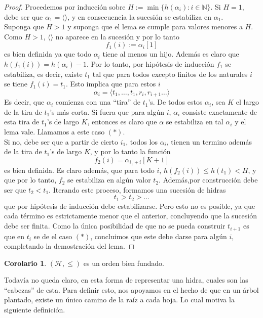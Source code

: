 \documentclass[a4paper,11pt]{article}
\newcommand{\matN}{\mathbb{N}}
\newcommand{\mH}{\mathcal{H}}
\newcommand{\lag}{\langle}
\newcommand{\rag}{\rangle}
\theoremstyle{definition}
\newtheorem{corolary}{Corolario}
\begin{document}
\begin{proof}
  Procedemos por inducción sobre $H := \min\{h(\alpha_i) : i \in \matN\}$. Si
  $H = 1$, debe ser que $\alpha_1= \lag\rag$, y en consecuencia la sucesión se estabiliza
  en $\alpha_1$.\\
  Suponga que $H>1$ y suponga que el lema se cumple para valores menores a $H$.
  Como $H>1$, $\lag\rag$ no aparece en la sucesión y por lo tanto
  $$
  f_{1}(i) := \alpha_i[1]
  $$
  es bien definida ya que todo $\alpha_i$ tiene al menos un hijo. Además
  es claro que $h(f_1(i)) = h(\alpha_i) - 1$. Por lo tanto, por hipótesis de inducción
  $f_1$ se estabiliza, es decir, existe $t_1$ tal que para todos excepto finitos
  de los naturales $i$ se tiene $f_1(i) = t_1$. Esto implica que para estos $i$
  $$
  \alpha_i = \lag t_1,\dots,t_1,r_i,r_{i+1}\dots\rag
  $$
  Es decir, que $\alpha_i$ comienza con una ``tira'' de $t_1$'s. De todos estos
  $\alpha_i$, sea $K$ el largo de la tira de $t_1$'s más corta. Si fuera
  que para algún $i$, $\alpha_i$ consiste exactamente de esta tira de $t_1$'s de
  largo $K$, entonces es claro que $\alpha$ se estabiliza en tal $\alpha_i$ y el
  lema vale. Llamamos a este caso $(\ast)$.\\
  Si no, debe ser que a partir de cierto $i_1$, todos los $\alpha_i$, tienen
  un termino además de la tira de $t_1$'s de largo $K$, y por lo tanto la función
  $$
  f_2(i) = \alpha_{i_1 + i}[K+1]
  $$
  es bien definida. Es claro además, que para todo $i$, $h(f_2(i)) \leq h(t_1) < H$,
  y que por lo tanto, $f_2$ se estabiliza en algún valor $t_2$. Además,por construcción
  debe ser que $t_2 < t_1$.
  Iterando este proceso, formamos una sucesión de hidras
  $$
  t_1 > t_2 > \dots
  $$
  que por hipótesis de inducción debe estabilizarse. Pero esto no es posible, ya que
  cada término es estrictamente menor que el anterior, concluyendo que la sucesión
  debe ser finita. Como la única posibilidad de que no se pueda construir $t_{i+1}$
  es que en $t_i$ se de el caso $(\ast)$, concluimos que este debe darse para algún $i$,
  completando la demostración del lema.
\end{proof}

\begin{corolary}
  $(\mH,\leq)$ es un orden bien fundado.
\end{corolary}

Todavía no queda claro, en esta forma de representar una
hidra, cuales son las ``cabezas'' de esta. Para definir esto, nos
apoyamos en el hecho de que en un árbol plantado, existe un único
camino de la raíz a cada hoja. Lo cual motiva la siguiente definición.
\end{document}
